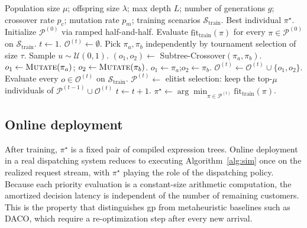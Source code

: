 \documentclass[pdflatex]{sn-jnl}
\begin{document}
\begin{algorithm}[h!]
\caption{Training procedure of \gls{gp}}
\label{alg:gphh-s}
\begin{algorithmic}[1]
\Require Population size $\mu$; offspring size $\lambda$; max depth $L$; number of generations $g$;
         crossover rate $p_c$; mutation rate $p_m$; training scenarios
         $\mathcal{S}_{\text{train}}$.
\Ensure Best individual $\pi^\star$.
\State Initialize $\mathcal{P}^{(0)}$ via ramped half-and-half.
\State Evaluate $\mathrm{fit_{\text{train}}}(\pi)$ for every $\pi\in\mathcal{P}^{(0)}$
       on $\mathcal{S}_{\text{train}}$.
\State $t\leftarrow 1$.
    \State $\mathcal{O}^{(t)}\leftarrow\emptyset$.
        \State Pick $\pi_a,\pi_b$ independently by tournament selection of size $\tau$.
        \State Sample $u\sim\mathcal{U}(0,1)$.
            \State $(o_1,o_2)\leftarrow$
                   Subtree-Crossover$(\pi_a,\pi_b)$.
            \State $o_1\leftarrow\textsc{Mutate}(\pi_a)$;\quad
                   $o_2\leftarrow\textsc{Mutate}(\pi_b)$.
        \Else
            \State $o_1\leftarrow\pi_a$;\quad $o_2\leftarrow\pi_b$.
        \EndIf
        \State $\mathcal{O}^{(t)}\leftarrow
               \mathcal{O}^{(t)}\cup\{o_1,o_2\}$.
    \EndFor
    \State Evaluate every $o\in\mathcal{O}^{(t)}$ on $\mathcal{S}_{\text{train}}$.
    \State $\mathcal{P}^{(t)}\leftarrow$ elitist selection: keep the
           top-$\mu$ individuals of
           $\mathcal{P}^{(t-1)}\cup\mathcal{O}^{(t)}$
    \State $t\leftarrow t+1$.
\EndWhile
\State \Return $\pi^\star\leftarrow
       \arg\min_{\pi\in\mathcal{P}^{(t)}}\mathrm{fit_{\text{train}}}(\pi)$.
\end{algorithmic}
\end{algorithm}

\subsection{Online deployment} \label{subsec:deploy}

After training, $\pi^\star$ is a fixed pair of compiled expression
trees. Online deployment in a real dispatching system reduces to
executing Algorithm~\ref{alg:sim} once on the realized request stream,
with $\pi^\star$ playing the role of the dispatching policy. Because
each priority evaluation is a constant-size arithmetic computation, the
amortized decision latency is independent of the number of remaining
customers. This is the property that distinguishes \gls{gp} from
metaheuristic baselines such as DACO, which require a re-optimization
step after every new arrival.
\end{document}
